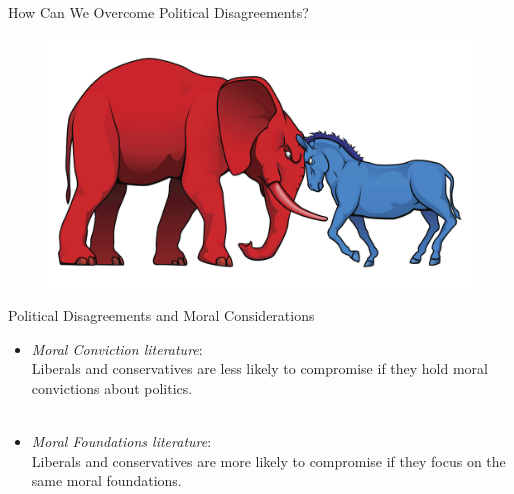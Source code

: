 \documentclass{beamer}
\begin{document}
\begin{frame}{How Can We Overcome Political Disagreements?}
\begin{figure}
\includegraphics[width=\textwidth]{fig/polarization_large.jpeg}
\end{figure}
\end{frame}

\begin{frame}{Political Disagreements and Moral Considerations}
\begin{itemize}
	\item<1-> \emph{Moral Conviction literature}:\\Liberals and conservatives are less likely to compromise if they hold moral convictions about politics.\\
	{\footnotesize\citep[e.g.,][]{skitka2014social,ryan2017no}}\\
	\vspace{1em}
	\item<2-> \emph{Moral Foundations literature}:\\Liberals and conservatives are more likely to compromise if they focus on the same moral foundations.\\
	{\footnotesize\citep[e.g.,][]{graham2009liberals,haidt2012righteous}}
\end{itemize}
\end{frame}
\end{document}
